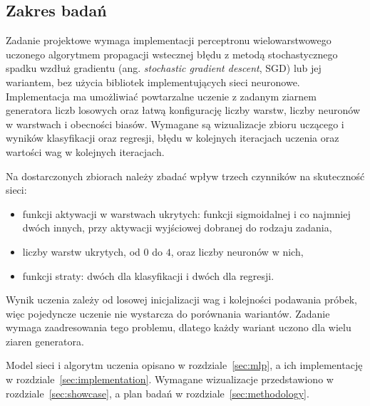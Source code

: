 \subsection{Zakres badań}
\label{sec:problem-scope}

Zadanie projektowe wymaga implementacji perceptronu wielowarstwowego uczonego algorytmem propagacji wstecznej błędu z metodą stochastycznego spadku wzdłuż gradientu (ang. \textit{stochastic gradient descent}, SGD) lub jej wariantem, bez użycia bibliotek implementujących sieci neuronowe. Implementacja ma umożliwiać powtarzalne uczenie z zadanym ziarnem generatora liczb losowych oraz łatwą konfigurację liczby warstw, liczby neuronów w warstwach i obecności biasów. Wymagane są wizualizacje zbioru uczącego i wyników klasyfikacji oraz regresji, błędu w kolejnych iteracjach uczenia oraz wartości wag w kolejnych iteracjach.

Na dostarczonych zbiorach należy zbadać wpływ trzech czynników na skuteczność sieci:
\begin{itemize}
    \item funkcji aktywacji w warstwach ukrytych: funkcji sigmoidalnej i co najmniej dwóch innych, przy aktywacji wyjściowej dobranej do rodzaju zadania,
    \item liczby warstw ukrytych, od $0$ do $4$, oraz liczby neuronów w nich,
    \item funkcji straty: dwóch dla klasyfikacji i dwóch dla regresji.
\end{itemize}

Wynik uczenia zależy od losowej inicjalizacji wag i kolejności podawania próbek, więc pojedyncze uczenie nie wystarcza do porównania wariantów. Zadanie wymaga zaadresowania tego problemu, dlatego każdy wariant uczono dla wielu ziaren generatora.

Model sieci i algorytm uczenia opisano w rozdziale~\ref{sec:mlp}, a ich implementację w rozdziale~\ref{sec:implementation}. Wymagane wizualizacje przedstawiono w rozdziale~\ref{sec:showcase}, a plan badań w rozdziale~\ref{sec:methodology}.
